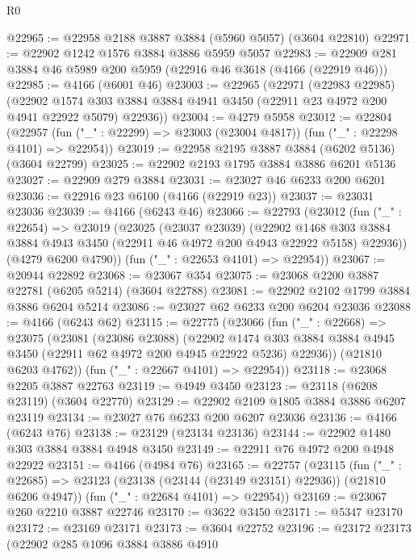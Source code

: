 \begin{lexlean}{R0}
\begin{coremodule}
@22965 := @22958 @2188 @3887 @3884 (@5960 @5057) (@3604 @22810)
@22971 := @22902 @1242 @1576 @3884 @3886 @5959 @5057
@22983 := @22909 @281 @3884 @46 @5989 @200 @5959 (@22916 @46 @3618 (@4166 (@22919 @46)))
@22985 := @4166 (@6001 @46)
@23003 := @22965
    (@22971
      (@22983 @22985)
      (@22902 @1574 @303 @3884 @3884 @4941 @3450 (@22911 @23 @4972 @200 @4941 @22922 @5079) @22936))
@23004 := @4279 @5958
@23012 := @22804
    (@22957 (fun ("_" : @22299) => @23003 (@23004 @4817)) (fun ("_" : @22298 @4101) => @22954))
@23019 := @22958 @2195 @3887 @3884 (@6202 @5136) (@3604 @22799)
@23025 := @22902 @2193 @1795 @3884 @3886 @6201 @5136
@23027 := @22909 @279 @3884
@23031 := @23027 @46 @6233 @200 @6201
@23036 := @22916 @23 @6100 (@4166 (@22919 @23))
@23037 := @23031 @23036
@23039 := @4166 (@6243 @46)
@23066 := @22793
    (@23012
      (fun ("_" : @22654) =>
      @23019
        (@23025
          (@23037 @23039)
          (@22902
            @1468
            @303
            @3884
            @3884
            @4943
            @3450
            (@22911 @46 @4972 @200 @4943 @22922 @5158)
            @22936))
        (@4279 @6200 @4790))
      (fun ("_" : @22653 @4101) => @22954))
@23067 := @20944 @22892
@23068 := @23067 @354
@23075 := @23068 @2200 @3887 @22781 (@6205 @5214) (@3604 @22788)
@23081 := @22902 @2102 @1799 @3884 @3886 @6204 @5214
@23086 := @23027 @62 @6233 @200 @6204 @23036
@23088 := @4166 (@6243 @62)
@23115 := @22775
    (@23066
      (fun ("_" : @22668) =>
      @23075
        (@23081
          (@23086 @23088)
          (@22902
            @1474
            @303
            @3884
            @3884
            @4945
            @3450
            (@22911 @62 @4972 @200 @4945 @22922 @5236)
            @22936))
        (@21810 @6203 @4762))
      (fun ("_" : @22667 @4101) => @22954))
@23118 := @23068 @2205 @3887 @22763
@23119 := @4949 @3450
@23123 := @23118 (@6208 @23119) (@3604 @22770)
@23129 := @22902 @2109 @1805 @3884 @3886 @6207 @23119
@23134 := @23027 @76 @6233 @200 @6207 @23036
@23136 := @4166 (@6243 @76)
@23138 := @23129 (@23134 @23136)
@23144 := @22902 @1480 @303 @3884 @3884 @4948 @3450
@23149 := @22911 @76 @4972 @200 @4948 @22922
@23151 := @4166 (@4984 @76)
@23165 := @22757
    (@23115
      (fun ("_" : @22685) => @23123 (@23138 (@23144 (@23149 @23151) @22936)) (@21810 @6206 @4947))
      (fun ("_" : @22684 @4101) => @22954))
@23169 := @23067 @260 @2210 @3887 @22746
@23170 := @3622 @3450
@23171 := @5347 @23170
@23172 := @23169 @23171
@23173 := @3604 @22752
@23196 := @23172
    @23173
    (@22902
      @285
      @1096
      @3884
      @3886
      @4910

\end{coremodule}
\end{lexlean}
